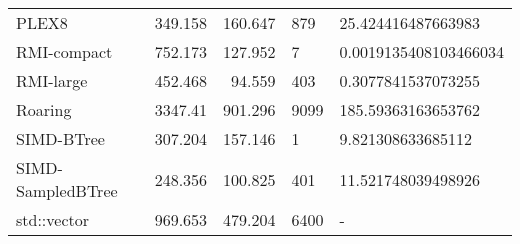 \begin{tabular}{lrrll}
 PLEX8             &                349.158 &               160.647 & 879          & 25.424416487663983    \\
 RMI-compact       &                752.173 &               127.952 & 7            & 0.0019135408103466034 \\
 RMI-large         &                452.468 &                94.559 & 403          & 0.3077841537073255    \\
 Roaring           &               3347.41  &               901.296 & 9099         & 185.59363163653762    \\
 SIMD-BTree        &                307.204 &               157.146 & 1            & 9.821308633685112     \\
 SIMD-SampledBTree &                248.356 &               100.825 & 401          & 11.521748039498926    \\
 std::vector       &                969.653 &               479.204 & 6400         & -                     \\
\hline
\end{tabular}